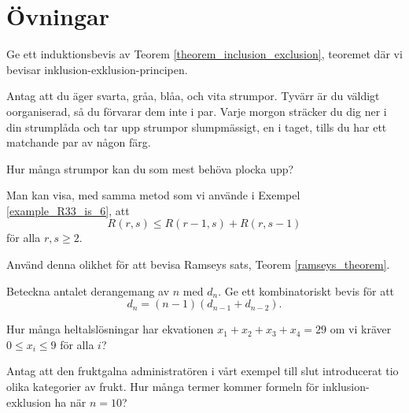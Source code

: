 \documentclass[nobib]{tufte-handout}
\begin{document}
\section{Övningar}

\begin{xca}
  Ge ett induktionsbevis av Teorem \ref{theorem_inclusion_exclusion}, teoremet där vi bevisar inklusion-exklusion-principen.
\end{xca}

\begin{xca}
  Antag att du äger svarta, gråa, blåa, och vita strumpor. Tyvärr är du väldigt oorganiserad, så du förvarar dem inte i par. Varje morgon sträcker du dig ner i din strumplåda och tar upp strumpor slumpmässigt, en i taget, tills du har ett matchande par av någon färg.

  Hur många strumpor kan du som mest behöva plocka upp?
\end{xca}

\begin{xca}
  Man kan visa, med samma metod som vi använde i Exempel \ref{example_R33_is_6}, att
  $$R(r,s) \leq R(r-1,s) + R(r, s-1)$$
  för alla $r, s \geq 2$.

  Använd denna olikhet för att bevisa Ramseys sats, Teorem \ref{ramseys_theorem}.
\end{xca}

\begin{xca}
  Beteckna antalet derangemang av $n$ med $d_n$. Ge ett kombinatoriskt bevis för att
  $$d_n = (n-1)(d_{n-1} + d_{n-2}).$$
\end{xca}

\begin{xca}
  Hur många heltalslösningar har ekvationen $x_1 + x_2 + x_3 + x_4 = 29$ om vi kräver $0 \leq x_i \leq 9$ för alla $i$?
\end{xca}

\begin{xca}
  Antag att den fruktgalna administratören i vårt exempel till slut introducerat tio olika kategorier av frukt. Hur många termer kommer formeln för inklusion-exklusion ha när $n = 10$?
\end{xca}

%
%
\end{document}

